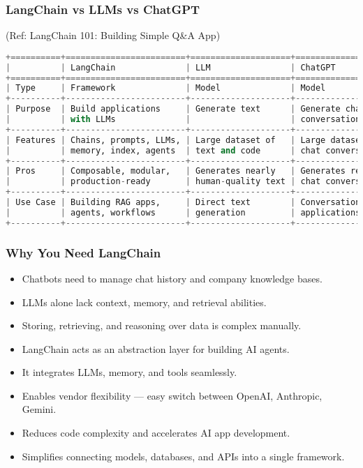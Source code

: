 \begin{frame}[fragile]\frametitle{LangChain vs LLMs vs ChatGPT}

{\tiny (Ref: LangChain 101: Building Simple Q\&A App)}


\begin{lstlisting}[language=python, basicstyle=\tiny]
+==========+========================+====================+====================+
|          | LangChain              | LLM                | ChatGPT            | 
+==========+========================+====================+====================+
| Type     | Framework              | Model              | Model              | 
+----------+------------------------+--------------------+--------------------+
| Purpose  | Build applications     | Generate text      | Generate chat      | 
|          | with LLMs              |                    | conversations      | 
+----------+------------------------+--------------------+--------------------+
| Features | Chains, prompts, LLMs, | Large dataset of   | Large dataset of   | 
|          | memory, index, agents  | text and code      | chat conversations | 
+----------+------------------------+--------------------+--------------------+
| Pros     | Composable, modular,   | Generates nearly   | Generates realistic| 
|          | production-ready       | human-quality text | chat conversations | 
+----------+------------------------+--------------------+--------------------+
| Use Case | Building RAG apps,     | Direct text        | Conversational AI  | 
|          | agents, workflows      | generation         | applications       | 
+----------+------------------------+--------------------+--------------------+
\end{lstlisting}

\end{frame}

\begin{frame}[fragile]\frametitle{Why You Need LangChain}
    \begin{itemize}
        \item Chatbots need to manage chat history and company knowledge bases.
        \item LLMs alone lack context, memory, and retrieval abilities.
        \item Storing, retrieving, and reasoning over data is complex manually.
        \item LangChain acts as an abstraction layer for building AI agents.
        \item It integrates LLMs, memory, and tools seamlessly.
        \item Enables vendor flexibility — easy switch between OpenAI, Anthropic, Gemini.
        \item Reduces code complexity and accelerates AI app development.
        \item Simplifies connecting models, databases, and APIs into a single framework.
    \end{itemize}
\end{frame}

